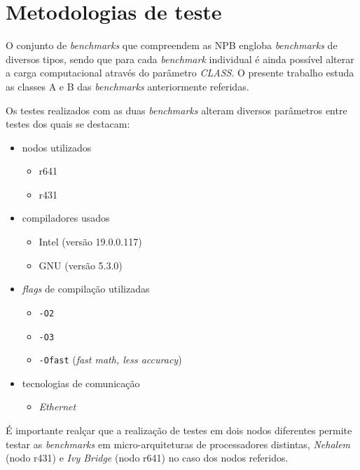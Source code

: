 \documentclass{article}
\begin{document}
\section{Metodologias de teste}

\quad O conjunto de \textit{benchmarks} que compreendem as NPB engloba \textit{benchmarks} de diversos tipos, sendo que para cada \textit{benchmark}
individual é ainda possível alterar a carga computacional através do parâmetro \textit{CLASS}.
O presente trabalho estuda as classes A e B das \textit{benchmarks} anteriormente referidas.

Os testes realizados com as duas \textit{benchmarks} alteram diversos parâmetros entre testes dos quais se destacam: 
\begin{itemize}
    \item nodos utilizados
        \begin{itemize}
            \item r641
            \item r431
        \end{itemize}
    \item compiladores usados
        \begin{itemize}
            \item Intel (versão 19.0.0.117)
            \item GNU (versão 5.3.0)
        \end{itemize}
    \item \textit{flags} de compilação utilizadas 
        \begin{itemize}
            \item \texttt{-O2}
            \item \texttt{-O3}
            \item \texttt{-Ofast} (\textit{fast math, less accuracy})
        \end{itemize}
    \item tecnologias de comunicação
        \begin{itemize}
            \item \textit{Ethernet}
        \end{itemize}
\end{itemize}

É importante realçar que a realização de testes em dois nodos diferentes permite testar as \textit{benchmarks} em micro-arquiteturas 
de processadores distintas, \textit{Nehalem} (nodo r431) e \textit{Ivy Bridge} (nodo r641) no caso dos nodos referidos.
\end{document}
